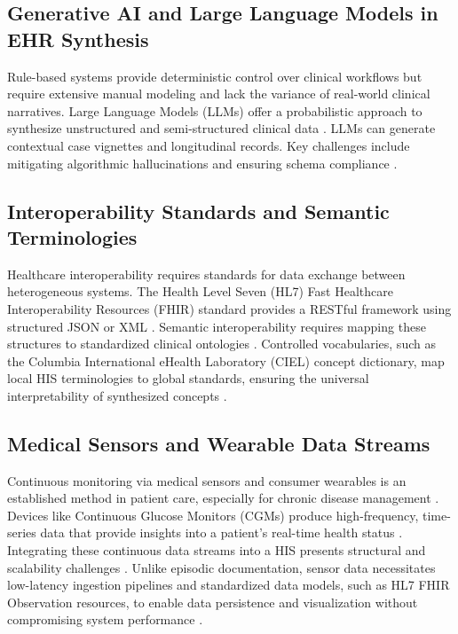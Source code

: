 \subsection*{Generative AI and Large Language Models in EHR Synthesis}
Rule-based systems provide deterministic control over clinical workflows but require extensive manual modeling and lack the variance of real-world clinical narratives. Large Language Models (LLMs) offer a probabilistic approach to synthesize unstructured and semi-structured clinical data \citep{Thirunavukarasu2023-um}. LLMs can generate contextual case vignettes and longitudinal records. Key challenges include mitigating algorithmic hallucinations and ensuring schema compliance \citep{agrawal2022, Thirunavukarasu2023-um}.

\subsection*{Interoperability Standards and Semantic Terminologies}
Healthcare interoperability requires standards for data exchange between heterogeneous systems. The Health Level Seven (HL7) Fast Healthcare Interoperability Resources (FHIR) standard provides a RESTful framework using structured JSON or XML \citep{Mandel2016-qy}. Semantic interoperability requires mapping these structures to standardized clinical ontologies \citep{Lehne2019-ox}. Controlled vocabularies, such as the Columbia International eHealth Laboratory (CIEL) concept dictionary, map local HIS terminologies to global standards, ensuring the universal interpretability of synthesized concepts \citep{Syzdykova2017-uf}.

\subsection*{Medical Sensors and Wearable Data Streams}
Continuous monitoring via medical sensors and consumer wearables is an established method in patient care, especially for chronic disease management \citep{Majumder2017-tg}. Devices like Continuous Glucose Monitors (CGMs) produce high-frequency, time-series data that provide insights into a patient's real-time health status \citep{FreeStyle_Libre_3}. Integrating these continuous data streams into a HIS presents structural and scalability challenges \citep{Majumder2017-tg}. Unlike episodic documentation, sensor data necessitates low-latency ingestion pipelines and standardized data models, such as HL7 FHIR Observation resources, to enable data persistence and visualization without compromising system performance \citep{Lehne2019-ox}.